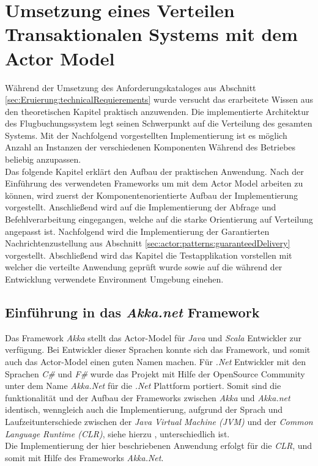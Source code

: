 \chapter{Umsetzung eines Verteilen Transaktionalen Systems mit dem Actor Model} 
\label{cha:practicalDevelopment}

Während der Umsetzung des Anforderungskataloges aus Abschnitt \ref{sec:Eruierung:technicalRequierements} wurde versucht das erarbeitete Wissen aus den theoretischen Kapitel praktisch anzuwenden. Die implementierte Architektur des Flugbuchungssystem legt seinen Schwerpunkt auf die Verteilung des gesamten Systems. Mit der Nachfolgend vorgestellten Implementierung ist es möglich Anzahl an Instanzen der verschiedenen Komponenten Während des Betriebes beliebig anzupassen. \\
Das folgende Kapitel erklärt den Aufbau der praktischen Anwendung. Nach der Einführung des verwendeten Frameworks um mit dem Actor Model arbeiten zu können, wird zuerst der Komponentenorientierte Aufbau der Implementierung vorgestellt. Anschließend wird auf die Implementierung der Abfrage und Befehlverarbeitung eingegangen, welche auf die starke Orientierung auf Verteilung angepasst ist. Nachfolgend wird die Implementierung der Garantierten Nachrichtenzustellung aus Abschnitt \ref{sec:actor:patterns:guaranteedDelivery} vorgestellt. Abschließend wird das Kapitel die Testapplikation vorstellen mit welcher die verteilte Anwendung geprüft wurde sowie auf die während der Entwicklung verwendete Environment Umgebung einehen.

\section{Einführung in das \textit{Akka.net} Framework}
Das Framework \textit{Akka} stellt das Actor-Model für \textit{Java} und \textit{Scala} Entwickler zur verfügung. Bei Entwickler dieser Sprachen konnte sich das Framework, und somit auch das Actor-Model einen guten Namen machen. Für \textit{.Net} Entwickler mit den Sprachen \textit{C\#} und \textit{F\#} wurde das Projekt mit Hilfe der OpenSource Community unter dem Name \textit{Akka.Net} für die \textit{.Net} Plattform portiert. Somit sind die funktionalität und der Aufbau der Frameworks zwischen \textit{Akka} und \textit{Akka.net} identisch, wenngleich auch die Implementierung, aufgrund der Sprach und Laufzeitunterschiede zwischen der \textit{Java Virtual Machine (JVM)} und der \textit{Common Language Runtime (CLR)}, siehe hierzu \cite{JvmVsClrsinger2003jvm}, unterschiedlich ist. \\
Die Implementierung der hier beschriebenen Anwendung erfolgt für die \textit{CLR}, und somit mit Hilfe des Frameworks \textit{Akka.Net}. 


